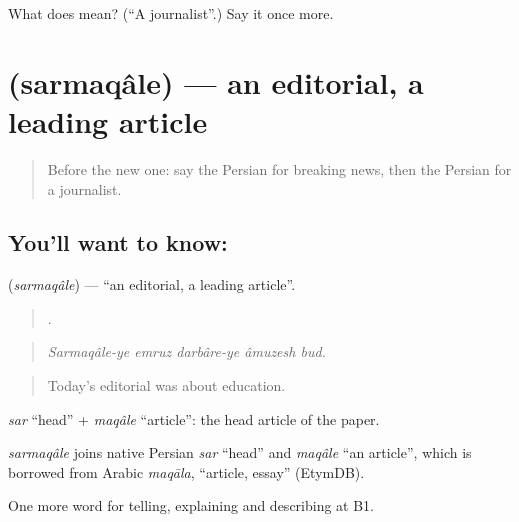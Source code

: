 \begin{tcolorbox}[breakable,colback=teal!4,colframe=teal!35!black,title={Before you move on}]
What does   mean? (\textquotedblleft{}A journalist\textquotedblright{}.) Say it once more.
\end{tcolorbox}
\section[\texorpdfstring{\fa{سرمقاله} (sarmaqâle)}{سرمقاله (sarmaqâle)}]{ (sarmaqâle) — an editorial, a leading article}

\label{lesson:FA-C315-sarmaqale}



\begin{quote}
Before the new one: say the Persian for breaking news, then the Persian for a journalist.
\end{quote}

\subsection*{You'll want to know: }
\textbf{} (\emph{sarmaqâle}) — \textquotedblleft{}an editorial, a leading article\textquotedblright{}.

\begin{quote}
    .
\end{quote}

\begin{quote}
\emph{Sarmaqâle-ye emruz darbâre-ye âmuzesh bud.}
\end{quote}

\begin{quote}
Today's editorial was about education.
\end{quote}

\emph{sar} \textquotedblleft{}head\textquotedblright{} + \emph{maqâle} \textquotedblleft{}article\textquotedblright{}: the head article of the paper.

\begin{cousinweb}
\emph{sarmaqâle} joins native Persian \emph{sar} \textquotedblleft{}head\textquotedblright{} and \emph{maqâle} \textquotedblleft{}an article\textquotedblright{}, which is borrowed from Arabic \emph{maqāla}, \textquotedblleft{}article, essay\textquotedblright{} (EtymDB).
\end{cousinweb}

\begin{grammarlens}[title={What you've built}]
One more word for telling, explaining and describing at B1.
\end{grammarlens}

